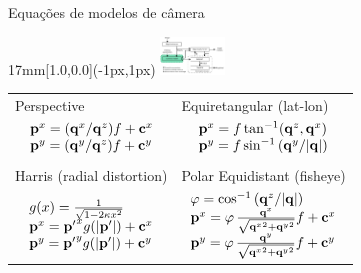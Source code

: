 \begin{frame}{Equações de modelos de câmera}
  \begin{textblock*}{17mm}[1.0,0.0](\paperwidth-1px,1px)
    \includegraphics[width=17mm]{blocos_s2.png}
  \end{textblock*}
  \begin{center}
    \begin{tabular}{ll}
      Perspective & Equiretangular (lat-lon)\\
      \multicolumn{1}{c}{
        $\begin{array}{l}
        {{\mathbf{p}}}^x = ({\mathbf{q}}^x/{\mathbf{q}}^z)f + {\mathbf{c}}^x\\
        {{\mathbf{p}}}^y = ({\mathbf{q}}^y/{\mathbf{q}}^z)f + {\mathbf{c}}^y
      \end{array}$}
      &
      \multicolumn{1}{c}{
      $\begin{array}{l}
        {\mathbf{p}}^x = f \tan^{-1}({\mathbf{q}}^z, {\mathbf{q}}^x)\\
        {\mathbf{p}}^y = f \sin^{-1}\left({\mathbf{q}}^y / |{\mathbf{q}}| \right)
      \end{array}$}
      \\[\baselineskip]\\
      Harris (radial distortion) & Polar Equidistant (fisheye)\\
      \multicolumn{1}{c}{
      $\begin{array}{l}
        \label{eqn:raddist}
        g(x)=\frac{1}{\sqrt{1-2\kappa x^2}}\\
        {\mathbf{p}}^x = {{\mathbf{p}}^\prime}^x g(|\mathbf{{\mathbf{p}}^\prime}|) + {\mathbf{c}}^x\\
        {\mathbf{p}}^y = {{\mathbf{p}}^\prime}^y g(|\mathbf{{\mathbf{p}}^\prime}|) + {\mathbf{c}}^y
      \end{array}$}
      &
      \multicolumn{1}{c}{
      $\begin{array}{l}
        \varphi = \cos^{-1}\left({\mathbf{q}}^z /  |{\mathbf{q}}| \right)\\
        {\mathbf{p}}^x = \varphi\, \frac{{\mathbf{q}}^x}{\sqrt{{{\mathbf{q}}^x}^2+{{\mathbf{q}}^y}^2}}f+{\mathbf{c}}^x\\
        {\mathbf{p}}^y = \varphi\, \frac{{\mathbf{q}}^y}{\sqrt{{{\mathbf{q}}^x}^2+{{\mathbf{q}}^y}^2}}f+{\mathbf{c}}^y
      \end{array}$}
    \end{tabular}
  \end{center}
\end{frame}

